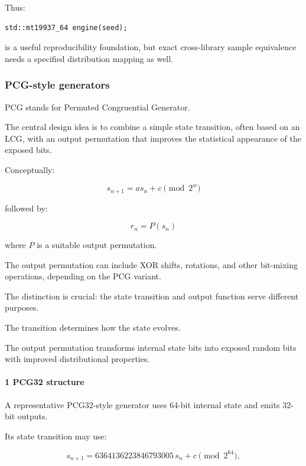 Thus:

\begin{verbatim}
std::mt19937_64 engine(seed);
\end{verbatim}

is a useful reproducibility foundation, but exact cross-library sample equivalence needs a specified distribution mapping as well.

\subsubsection{PCG-style generators}\label{02-foundations-ii-ch029-pcg-style-generators}

\hypertarget{02-foundations-ii-ch029-pcg-style-generators}{}

PCG stands for Permuted Congruential Generator.

The central design idea is to combine a simple state transition, often based on an LCG, with an output permutation that improves the statistical appearance of the exposed bits.

Conceptually:

\[
 \boxed{ s_{n+1}=as_n+c\pmod{2^w} }
\]

followed by:

\[
 \boxed{ r_n=P(s_n) }
\]

where \(P\) is a suitable output permutation.

The output permutation can include XOR shifts, rotations, and other bit-mixing operations, depending on the PCG variant.

The distinction is crucial: the state transition and output function serve different purposes.

The transition determines how the state evolves.

The output permutation transforms internal state bits into exposed random bits with improved distributional properties.

\paragraph{1 PCG32 structure}\label{02-foundations-ii-ch029-pcg32-structure}

\hypertarget{02-foundations-ii-ch029-pcg32-structure}{}

A representative PCG32-style generator uses 64-bit internal state and emits 32-bit outputs.

Its state transition may use:

\[
 s_{n+1} = 6364136223846793005\,s_n+c \pmod{2^{64}},
\]

